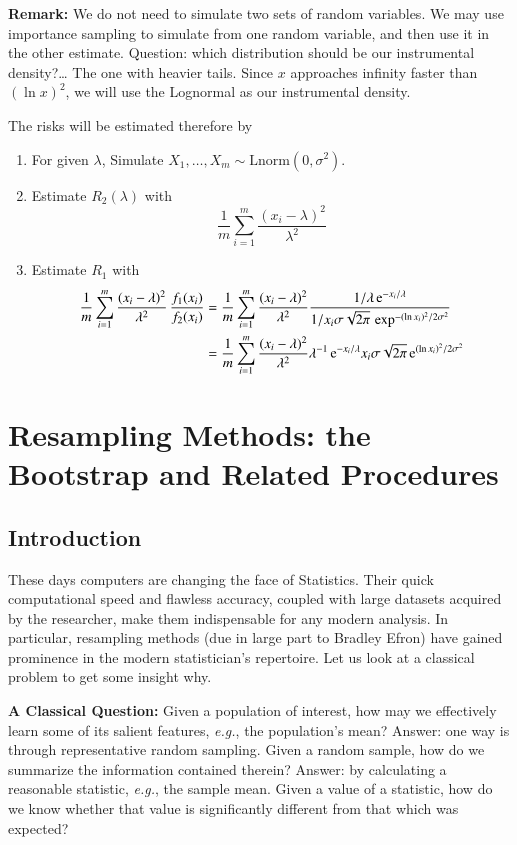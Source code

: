 \documentclass[captions=tableheading]{scrbook}
\begin{document}
\textbf{Remark:}  We do not need to simulate two sets of random variables. We may use importance sampling to simulate from one random variable, and then use it in the other estimate. Question: which distribution should be our instrumental density?\ldots{} The one with heavier tails. Since $x$ approaches infinity faster than $(\ln x)^{2}$, we will use the Lognormal as our instrumental density.

The risks will be estimated therefore by

\begin{enumerate}
\item For given $\lambda$, Simulate $X_{1},\ldots,X_{m} \sim \mathrm{Lnorm}(0,\sigma^{2})$.
\item Estimate $R_{2}(\lambda)$ with 
   \[
   \frac{1}{m}\sum_{i=1}^{m}\frac{(x_{i}-\lambda)^{2}}{\lambda^{2}}
   \]
\item Estimate $R_{1}$ with 
   \begin{align*}
   \frac{1}{m}\sum_{i=1}^{m}\frac{(x_{i}-\lambda)^{2}}{\lambda^{2}}\,\frac{f_{1}(x_{i})}{f_{2}(x_{i})} & =\frac{1}{m}\sum_{i=1}^{m}\frac{(x_{i}-\lambda)^{2}}{\lambda^{2}}\frac{1/\lambda\, \mathrm{e}^{-x_{i}/\lambda}}{1/x_{i}\sigma\sqrt{2\pi}\,\exp^{-(\ln x_{i})^{2}/2\sigma^{2}}}\\
 & =\frac{1}{m}\sum_{i=1}^{m}\frac{(x_{i}-\lambda)^{2}}{\lambda^{2}}\lambda^{-1}\, \mathrm{e}^{-x_{i}/\lambda}x_{i}\sigma\sqrt{2\pi}\, \mathrm{e}^{(\ln x_{i})^{2}/2\sigma^{2}}
   \end{align*}
\end{enumerate}
\chapter{Resampling Methods: the Bootstrap and Related Procedures}
\label{sec-4}
\section{Introduction}
\label{sec-4_1}


These days computers are changing the face of Statistics. Their quick computational speed and flawless accuracy, coupled with large datasets acquired by the researcher, make them indispensable for any modern analysis. In particular, resampling methods (due in large part to Bradley Efron) have gained prominence in the modern statistician's repertoire. Let us look at a classical problem to get some insight
why.

\textbf{A Classical Question:} Given a population of interest, how may we effectively learn some of its salient features, \emph{e.g.}, the population's mean? Answer: one way is through representative random sampling. Given a random sample, how do we summarize the information contained therein? Answer: by calculating a reasonable statistic, \emph{e.g.}, the sample mean. Given a value of a statistic, how do we know whether that value is significantly different from that which was expected?
\end{document}
